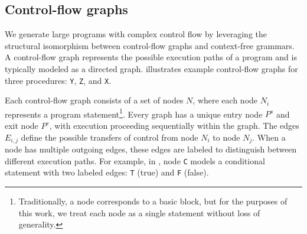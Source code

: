 \documentclass[conference]{IEEEtran}
\def\<#1>{\texttt{#1}}
\begin{document}


\subsection{Control-flow graphs}
We generate large programs with complex control flow by leveraging the structural isomorphism between control-flow graphs and context-free grammars. A control-flow graph represents the possible execution paths of a program and is typically modeled as a directed graph.  illustrates example control-flow graphs for three procedures: \<Y>, \<Z>, and \<X>.

Each control-flow graph consists of a set of nodes $N$, where each node $N_i$ represents a program statement\footnote{Traditionally, a node corresponds to a basic block, but for the purposes of this work, we treat each node as a single statement without loss of generality.}. Every graph has a unique entry node $P^s$ and exit node $P^e$, with execution proceeding sequentially within the graph. The edges $E_{i,j}$ define the possible transfers of control from node $N_i$ to node $N_j$. When a node has multiple outgoing edges, these edges are labeled to distinguish between different execution paths. For example, in , node \<C> models a conditional statement with two labeled edges: \<T> (true) and \<F> (false).
\end{document}
